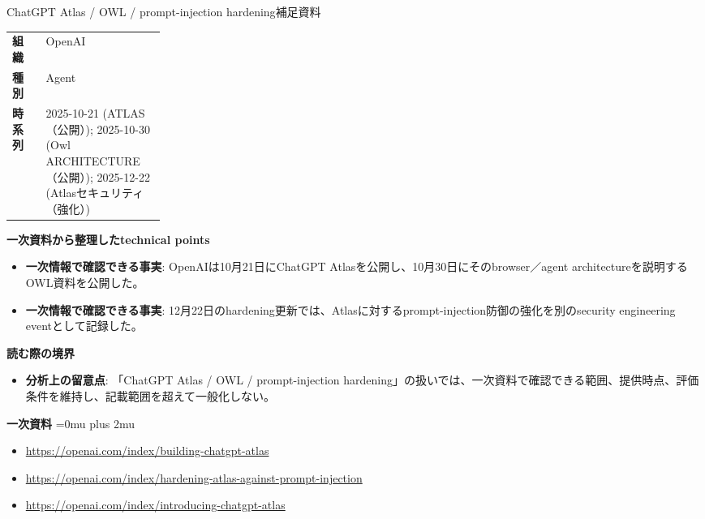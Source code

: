 \begin{technicalnote}{ChatGPT Atlas / OWL / prompt-injection hardening}{補足資料}
\begingroup
\begin{tabularx}{\linewidth}{@{}>{\bfseries}p{0.22\linewidth}X@{}}
組織 & OpenAI \\
種別 & Agent \\
時系列 & 2025-10-21 (ATLAS（公開）); 2025-10-30 (Owl ARCHITECTURE（公開）); 2025-12-22 (Atlasセキュリティ（強化）) \\
\end{tabularx}
\smallskip
{\bfseries 一次資料から整理したtechnical points}
\begin{itemize}[leftmargin=1.5em,itemsep=0.35em]
\item \textbf{一次情報で確認できる事実}: OpenAIは10月21日にChatGPT Atlasを公開し、10月30日にそのbrowser／agent architectureを説明するOWL資料を公開した。
\item \textbf{一次情報で確認できる事実}: 12月22日のhardening更新では、Atlasに対するprompt-injection防御の強化を別のsecurity engineering eventとして記録した。
\end{itemize}
\begin{minipage}{\linewidth}
{\bfseries 読む際の境界}
\begin{itemize}[leftmargin=1.5em,itemsep=0.35em]
\item \textbf{分析上の留意点}: 「ChatGPT Atlas / OWL / prompt-injection hardening」の扱いでは、一次資料で確認できる範囲、提供時点、評価条件を維持し、記載範囲を超えて一般化しない。
\end{itemize}
\begin{samepage}
{\bfseries 一次資料}
\begingroup\sloppy
\Urlmuskip=0mu plus 2mu\relax
\begin{itemize}[leftmargin=1.5em,itemsep=0.25em]
\item {\scriptsize\url{https://openai.com/index/building-chatgpt-atlas}}
\item {\scriptsize\url{https://openai.com/index/hardening-atlas-against-prompt-injection}}
\item {\scriptsize\url{https://openai.com/index/introducing-chatgpt-atlas}}
\end{itemize}
\endgroup
\end{samepage}
\end{minipage}
\endgroup
\end{technicalnote}
\medskip

